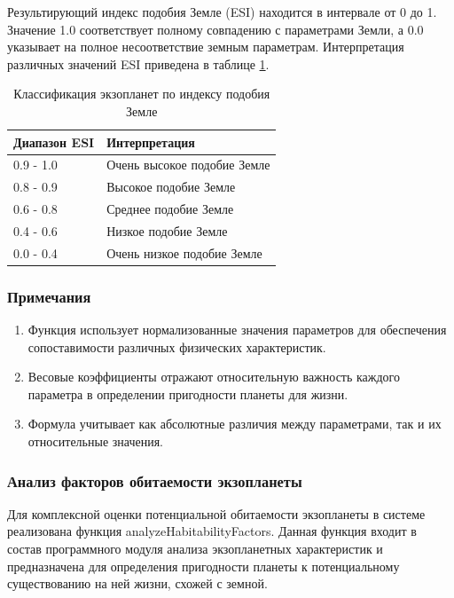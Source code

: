 Результирующий индекс подобия Земле (ESI) находится в интервале от 0 до 1. Значение 1.0 соответствует полному совпадению с параметрами Земли, а 0.0 указывает на полное несоответствие земным параметрам. Интерпретация различных значений ESI приведена в таблице \ref{tab:esi_classification}.

\begin{table}[h]
\captionsetup{justification=raggedright,singlelinecheck=false}
\caption{Классификация экзопланет по индексу подобия Земле}
\label{tab:esi_classification}
\begin{tabular}{|l|l|}
\hline
\textbf{Диапазон ESI} & \textbf{Интерпретация} \\
\hline
0.9 - 1.0 & Очень высокое подобие Земле \\
0.8 - 0.9 & Высокое подобие Земле \\
0.6 - 0.8 & Среднее подобие Земле \\
0.4 - 0.6 & Низкое подобие Земле \\
0.0 - 0.4 & Очень низкое подобие Земле \\
\hline
\end{tabular}
\end{table}

\subsubsection{Примечания}

\begin{enumerate}
    \item Функция использует нормализованные значения параметров для обеспечения сопоставимости различных физических характеристик.
    \item Весовые коэффициенты отражают относительную важность каждого параметра в определении пригодности планеты для жизни.
    \item Формула учитывает как абсолютные различия между параметрами, так и их относительные значения.
\end{enumerate}

\subsubsection{Анализ факторов обитаемости экзопланеты}

Для комплексной оценки потенциальной обитаемости экзопланеты в системе реализована функция analyzeHabitabilityFactors. Данная функция входит в состав программного модуля анализа экзопланетных характеристик и предназначена для определения пригодности планеты к потенциальному существованию на ней жизни, схожей с земной.

